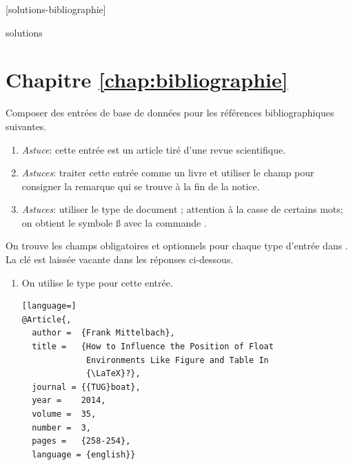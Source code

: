 [solutions-bibliographie]

\begin{Filesave}{solutions}
\section*{Chapitre \ref*{chap:bibliographie}}

\end{Filesave}

\begin{exercice}
  Composer des entrées de base de données pour les références
  bibliographiques suivantes.
  \begin{enumerate}
  \item {}

    \emph{Astuce}: cette entrée est un article tiré d'une revue
    scientifique.

  \item {}

    \emph{Astuces}: traiter cette entrée comme un livre et utiliser le
    champ  pour consigner la remarque qui se trouve à la
    fin de la notice.

  \item {}

    \emph{Astuces}: utiliser le type de document ;
    attention à la casse de certains mots; on obtient le symbole {\ss}
    avec la commande \cmdprint{\ss}.
  \end{enumerate}
  \begin{sol}
    On trouve les champs obligatoires et optionnels pour chaque type
    d'entrée dans %
    . %
    La clé est laissée vacante dans les réponses ci-dessous.
    \begin{enumerate}
    \item On utilise le type  pour cette entrée.
\begin{lstlisting}[language=]
@Article{,
  author =  {Frank Mittelbach},
  title =   {How to Influence the Position of Float
             Environments Like Figure and Table In
             {\LaTeX}?},
  journal = {{TUG}boat},
  year =    2014,
  volume =  35,
  number =  3,
  pages =   {258-254},
  language = {english}}
\end{lstlisting}


\end{enumerate}
\end{sol}
\end{exercice}
